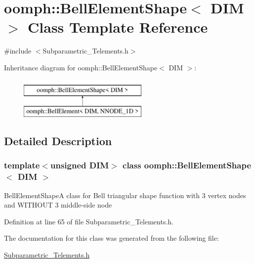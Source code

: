 \hypertarget{classoomph_1_1BellElementShape}{}\section{oomph\+:\+:Bell\+Element\+Shape$<$ D\+IM $>$ Class Template Reference}
\label{classoomph_1_1BellElementShape}


{\ttfamily \#include $<$Subparametric\+\_\+\+Telements.\+h$>$}

Inheritance diagram for oomph\+:\+:Bell\+Element\+Shape$<$ D\+IM $>$\+:\begin{figure}[H]
\begin{center}
\leavevmode
\includegraphics[height=2.000000cm]{classoomph_1_1BellElementShape}
\end{center}
\end{figure}


\subsection{Detailed Description}
\subsubsection*{template$<$unsigned D\+IM$>$\newline
class oomph\+::\+Bell\+Element\+Shape$<$ D\+I\+M $>$}

Bell\+Element\+ShapeA class for Bell triangular shape function with 3 vertex nodes and W\+I\+T\+H\+O\+UT 3 middle-\/side node 

Definition at line 65 of file Subparametric\+\_\+\+Telements.\+h.



The documentation for this class was generated from the following file\+:\begin{DoxyCompactItemize}
\item 
\hyperlink{Subparametric__Telements_8h}{Subparametric\+\_\+\+Telements.\+h}\end{DoxyCompactItemize}

